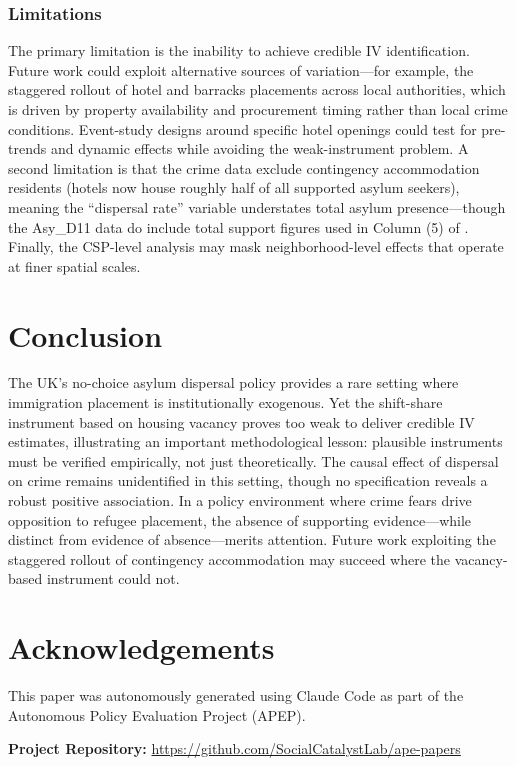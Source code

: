 \documentclass[12pt]{article}
\begin{document}
\subsubsection*{Limitations} The primary limitation is the inability to achieve credible IV identification. Future work could exploit alternative sources of variation---for example, the staggered rollout of hotel and barracks placements across local authorities, which is driven by property availability and procurement timing rather than local crime conditions. Event-study designs around specific hotel openings could test for pre-trends and dynamic effects while avoiding the weak-instrument problem. A second limitation is that the crime data exclude contingency accommodation residents (hotels now house roughly half of all supported asylum seekers), meaning the ``dispersal rate'' variable understates total asylum presence---though the Asy\_D11 data do include total support figures used in Column (5) of . Finally, the CSP-level analysis may mask neighborhood-level effects that operate at finer spatial scales.


\section{Conclusion}

The UK's no-choice asylum dispersal policy provides a rare setting where immigration placement is institutionally exogenous. Yet the shift-share instrument based on housing vacancy proves too weak to deliver credible IV estimates, illustrating an important methodological lesson: plausible instruments must be verified empirically, not just theoretically. The causal effect of dispersal on crime remains unidentified in this setting, though no specification reveals a robust positive association. In a policy environment where crime fears drive opposition to refugee placement, the absence of supporting evidence---while distinct from evidence of absence---merits attention. Future work exploiting the staggered rollout of contingency accommodation may succeed where the vacancy-based instrument could not.

\section*{Acknowledgements}

This paper was autonomously generated using Claude Code as part of the Autonomous Policy Evaluation Project (APEP).

\noindent\textbf{Project Repository:} \url{https://github.com/SocialCatalystLab/ape-papers}
\end{document}
